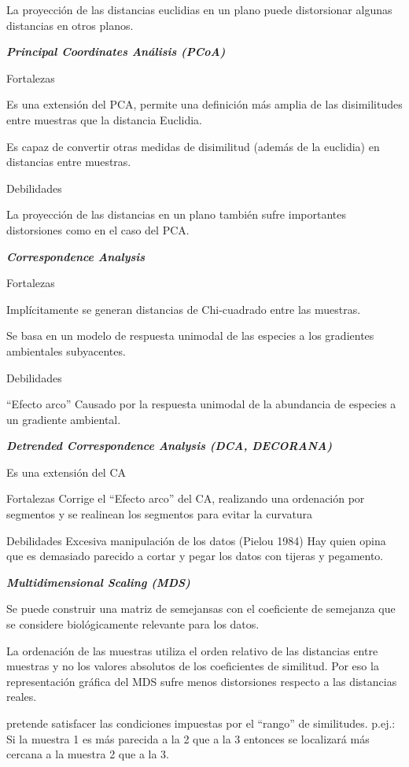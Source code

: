 \documentclass[]{book}
\begin{document}
La proyección de las distancias euclidias en un plano puede distorsionar
algunas distancias en otros planos.

\textbf{\emph{Principal Coordinates Análisis (PCoA)}}

Fortalezas

Es una extensión del PCA, permite una definición más amplia de las
disimilitudes entre muestras que la distancia Euclidia.

Es capaz de convertir otras medidas de disimilitud (además de la
euclidia) en distancias entre muestras.

Debilidades

La proyección de las distancias en un plano también sufre importantes
distorsiones como en el caso del PCA.

\textbf{\emph{Correspondence Analysis}}

Fortalezas

Implícitamente se generan distancias de Chi-cuadrado entre las muestras.

Se basa en un modelo de respuesta unimodal de las especies a los
gradientes ambientales subyacentes.

Debilidades

``Efecto arco'' Causado por la respuesta unimodal de la abundancia de
especies a un gradiente ambiental.

\textbf{\emph{Detrended Correspondence Analysis (DCA, DECORANA)}}

Es una extensión del CA

Fortalezas Corrige el ``Efecto arco'' del CA, realizando una ordenación
por segmentos y se realinean los segmentos para evitar la curvatura

Debilidades Excesiva manipulación de los datos (Pielou 1984) Hay quien
opina que es demasiado parecido a cortar y pegar los datos con tijeras y
pegamento.

\textbf{\emph{Multidimensional Scaling (MDS)}}

Se puede construir una matriz de semejansas con el coeficiente de
semejanza que se considere biológicamente relevante para los datos.

La ordenación de las muestras utiliza el orden relativo de las
distancias entre muestras y no los valores absolutos de los coeficientes
de similitud. Por eso la representación gráfica del MDS sufre menos
distorsiones respecto a las distancias reales.

pretende satisfacer las condiciones impuestas por el ``rango'' de
similitudes. p.ej.: Si la muestra 1 es más parecida a la 2 que a la 3
entonces se localizará más cercana a la muestra 2 que a la 3.
\end{document}

